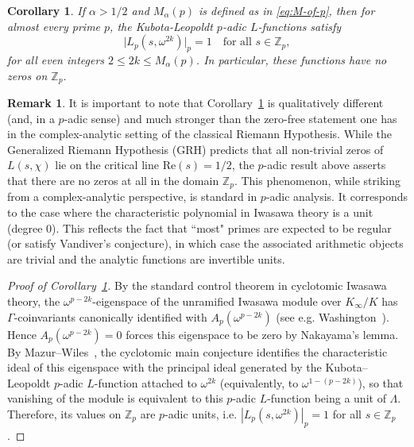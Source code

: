 \documentclass[12pt]{amsart}
\theoremstyle{plain}
\newtheorem{corollary}[theorem]{Corollary}
\theoremstyle{definition}
\newtheorem{remark}[theorem]{Remark}
\newcommand{\ZZ}{\mathbb{Z}}
\begin{document}
\begin{corollary}\label{RH}
  If $\alpha >1/2$ and $M_{\alpha}(p)$ is defined as in \eqref{eq:M-of-p}, then for almost every prime $p$,
  the Kubota-Leopoldt $p$-adic $L$-functions satisfy
  \[
    \big| L_p(s, \omega^{2k}) \big|_p = 1 \quad \text{for all } s \in \mathbb{Z}_p,
  \]
  for all even integers $2 \le 2k \le M_{\alpha}(p)$.
  In particular, these functions have no zeros on $\mathbb{Z}_p$.
\end{corollary}


\begin{remark}
    It is important to note that Corollary~\ref{RH} is qualitatively different (and, in a
$p$-adic sense) and much stronger than the zero-free statement one has in the
complex-analytic setting of the classical Riemann Hypothesis.
    While the Generalized Riemann Hypothesis (GRH) predicts that all non-trivial
    zeros of $L(s, \chi)$ lie on the critical line $\text{Re}(s) = 1/2$,
    the $p$-adic result above asserts that there are no zeros at all in the domain $\ZZ_p$.
    This phenomenon, while striking from a complex-analytic perspective, is standard in $p$-adic analysis.
    It corresponds to the case where the characteristic polynomial in Iwasawa theory is a unit (degree 0).
    This reflects the fact that ``most" primes are expected to be regular (or satisfy Vandiver's conjecture),
    in which case the associated arithmetic objects are trivial and the analytic
    functions are invertible units.
\end{remark}
\begin{proof}[Proof of Corollary~\ref{RH}]
By the standard control theorem in cyclotomic Iwasawa theory, the $\omega^{p-2k}$-eigenspace of the
unramified Iwasawa module over $K_\infty/K$ has $\Gamma$-coinvariants canonically identified with
$A_p(\omega^{p-2k})$ (see e.g. Washington~\cite[Ch.~13]{Washington1997}).  Hence
$A_p(\omega^{p-2k})=0$ forces this eigenspace to be zero by Nakayama's lemma.
By Mazur--Wiles~\cite{MazurWiles}, the cyclotomic main conjecture identifies the characteristic
ideal of this eigenspace with the principal ideal generated by the Kubota--Leopoldt $p$-adic
$L$-function attached to $\omega^{2k}$ (equivalently, to $\omega^{1-(p-2k)}$), so that vanishing of the
module is equivalent to this $p$-adic $L$-function being a unit of $\Lambda$.
Therefore, its values on $\ZZ_p$ are $p$-adic units, i.e.
$|L_p(s,\omega^{2k})|_p=1$ for all $s\in\ZZ_p$.
\end{proof}
\end{document}
